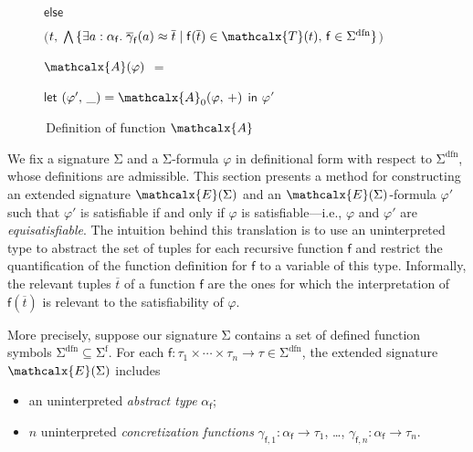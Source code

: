 \documentclass[runningheads,a4paper]{llncs}
\newcommand\return{}
\newcommand\bigtuple[1]{$\bigl(${#1}$\bigr)$}
\newcommand{\con}[1]{\mathsf{#1}}
\renewcommand\vec[1]{\overline{#1}}
\let\oldSigma=\Sigma
\def\Sigma{\mathrm{\oldSigma}}
\newcommand{\teq}{\approx}
\newcommand{\terms}{\mathcalx{T}}
\newcommand{\conv}{\mathcalx{A}}
\newcommand{\sfuns}[1]{#1^\mathrm{f}}
\newcommand{\sfundefs}[1]{#1^\mathrm{dfn}}
\newcommand{\ppos}{{+}}
\newcommand\concret{\gamma} %
\newcommand{\vecfarg}[1]{\vec{\concret}_{#1}}
\newcommand{\farg}[1]{\concret_{#1}}
\newcommand{\fargx}[2]{\concret_{#1,#2}}
\newcommand{\fargtype}[1]{\alpha_{#1}}
\newcommand{\extendsig}[1]{\mathcalx{E}( #1 )}
\begin{document}
\begin{figure}[t]
\begin{enumerate}
\begin{itemize}
   \itemx[] $\mathsf{else}$
   \begin{itemize}
     \itemx[] \return \bigtuple{$t,\; \bigwedge\, \{ \exists a : \fargtype{\con{f}}.\; \vecfarg{\con{f}}( a ) \teq \vec t \mid \con{f}( \vec t ) \in \terms( t ),\, \con{f} \in \sfundefs{\Sigma} \}$}
   \end{itemize}
 \end{itemize}
\end{enumerate}
\begin{enumerate}
\itemx[\ ]
$\conv( \varphi )$ $=$
\\[-.8\baselineskip]
 \begin{itemize}
   \itemx[] $\mathsf{let}$ $( \varphi',\, \_ ) = \conv_0( \varphi,\, \ppos )$ $\mathsf{in}$
   \itemx[] \return $\varphi'$
  \end{itemize}
\end{enumerate}
\caption{\,Definition of function $\conv$}
\label{fig:A}
\end{figure}

We fix a signature $\Sigma$ and a $\Sigma$-formula
$\varphi$ in definitional form with respect to $\sfundefs{\Sigma}$,
whose definitions are admissible.
This section presents a method for constructing an extended signature
$\extendsig{ \Sigma }$ and an $\extendsig{ \Sigma }$-formula $\varphi'$ such that
$\varphi'$ is satisfiable if and only if $\varphi$ is satisfiable---i.e.,
$\varphi$ and $\varphi'$ are \emph{equisatisfiable}.
The intuition behind this translation
is to use an uninterpreted type to abstract the set of
 tuples for each recursive function $\con{f}$ and restrict the
quantification of the function definition for $\con{f}$ to a variable of this
type. Informally, the relevant tuples $\vec t$ of a function $\con{f}$ are the
ones for which the interpretation of $\con{f}( \vec t )$ is relevant to the
satisfiability of $\varphi$.

More precisely,
suppose our signature $\Sigma$ contains a set of defined function symbols $\sfundefs{\Sigma} \subseteq \sfuns{\Sigma}$.
For each $\con{f} : \tau_1 \times \cdots \times \tau_n \rightarrow \tau \in \sfundefs{\Sigma}$,
the extended signature $\extendsig{\Sigma}$ includes
\begin{itemize}
\item an uninterpreted \emph{abstract type} $\fargtype{\con{f}}$;
\item $n$ uninterpreted \emph{concretization functions} $\fargx{\con{f}}{1} : \fargtype{\con{f}} \rightarrow \tau_1$, \ldots, $\fargx{\con{f}}{n} : \fargtype{\con{f}} \rightarrow \tau_n$.
\end{itemize}
\end{document}
